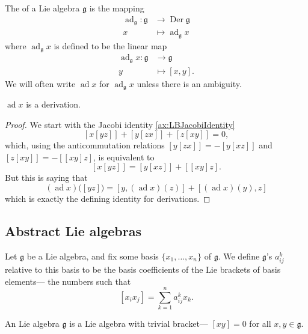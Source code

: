 \documentclass{article}
\newcommand{\lb}[1]{\ensuremath{\left[{#1}\right]}}
\DeclareMathOperator{\Der}{Der}
\DeclareMathOperator{\ad}{ad}
\newcommand{\frkg}{{\ensuremath{\mathfrak{g}}}}
\begin{document}
\begin{definition}
    The  of a Lie algebra $\frkg$ is the mapping
    \begin{align*}
        \ad_\frkg:
        \frkg 
        &\to
        \Der \frkg
        \\
        x 
        &\mapsto 
        \ad_\frkg x
    \end{align*}
    where $\ad_\frkg x$ is defined to be the linear map
    \begin{align*}
        \ad_\frkg x: 
        \frkg 
        &\to 
        \frkg \\
        y 
        &\mapsto
        \lb{x,y}.
    \end{align*}
    We will often write $\ad x$ for $\ad_\frkg x$ unless there is an ambiguity.
\end{definition}

\begin{proposition}
    $\ad x$ is a derivation.
\end{proposition}
\begin{proof}
    We start with the Jacobi identity \ref{ax:LBJacobiIdentity}
    \[
        \lb{x\lb{yz}} + \lb{y\lb{zx}} + \lb{z\lb{xy}}
        =
        0,
    \]
    which, using the anticommutation relations $\lb{y\lb{zx}} = -\lb{y\lb{xz}}$ and $\lb{z\lb{xy}} = -\lb{\lb{xy}z}$, is equivalent to
    \[
        \lb{x\lb{yz}}
        =
        \lb{y\lb{xz}} + \lb{\lb{xy}{z}}.
    \]
    But this is saying that
    \[
        (\ad x)\Big(\lb{yz}\Big)
        =
        \lb{y, (\ad x) (z)}
        +
        \lb{(\ad x)(y), z}
    \]
    which is exactly the defining identity for derivations.
\end{proof}


\subsection{Abstract Lie algebras}

\begin{definition}
    Let $\frkg$ be a Lie algebra, and fix some basis $\{x_1,\ldots,x_n\}$ of $\frkg$.
    We define $\frkg$'s  $a^k_{ij}$ relative to this basis to be the basis coefficients of the Lie brackets of basis elements--- the numbers such that
    \[
        \lb{x_ix_j}
        =
        \sum_{k=1}^n
        a^k_{ij}
        x_k.
    \]
\end{definition}

\begin{definition}
    An  Lie algebra $\frkg$ is a Lie algebra with trivial bracket--- $\lb{xy} = 0$ for all $x,y \in \frkg$.
\end{definition}
\end{document}

